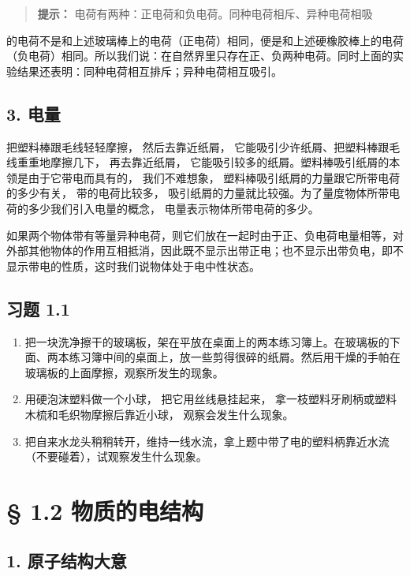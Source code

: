 \begin{quote}
\textbf{提示：} 电荷有两种：正电荷和负电荷。同种电荷相斥、异种电荷相吸
\end{quote}

的电荷不是和上述玻璃棒上的电荷（正电荷）相同，便是和上述硬橡胶棒上的电荷（负电荷）相同。所以我们说：在自然界里只存在正、负两种电荷。同时上面的实验结果还表明：同种电荷相互排斥；异种电荷相互吸引。

\subsection{3. 电量}\label{ux7535ux91cf}

把塑料棒跟毛线轻轻摩擦， 然后去靠近纸屑，
它能吸引少许纸屑、把塑料棒跟毛线重重地摩擦几下， 再去靠近纸屑，
它能吸引较多的纸屑。塑料棒吸引纸屑的本领是由于它带电而具有的，
我们不难想象， 塑料棒吸引纸屑的力量跟它所带电荷的多少有关，
带的电荷比较多，
吸引纸屑的力量就比较强。为了量度物体所带电荷的多少我们引入电量的概念，
电量表示物体所带电荷的多少。

如果两个物体带有等量异种电荷，则它们放在一起时由于正、负电荷电量相等，对外部其他物体的作用互相抵消，因此既不显示出带正电；也不显示出带负电，即不显示带电的性质，这时我们说物体处于电中性状态。

\subsection{习题 1.1}\label{ux4e60ux9898-1.1}

\begin{enumerate}
\def\labelenumi{\arabic{enumi}.}
\item
  把一块洗净擦干的玻璃板，架在平放在桌面上的两本练习簿上。在玻璃板的下面、两本练习簿中间的桌面上，放一些剪得很碎的纸屑。然后用干燥的手帕在玻璃板的上面摩擦，观察所发生的现象。
\item
  用硬泡沫塑料做一个小球， 把它用丝线悬挂起来，
  拿一枝塑料牙刷柄或塑料木梳和毛织物摩擦后靠近小球，
  观察会发生什么现象。
\item
  把自来水龙头稍稍转开，维持一线水流，拿上题中带了电的塑料柄靠近水流（不要碰着），试观察发生什么现象。
\end{enumerate}

\section{§ 1.2 物质的电结构}\label{ux7269ux8d28ux7684ux7535ux7ed3ux6784}

\subsection{1. 原子结构大意}\label{ux539fux5b50ux7ed3ux6784ux5927ux610f}

